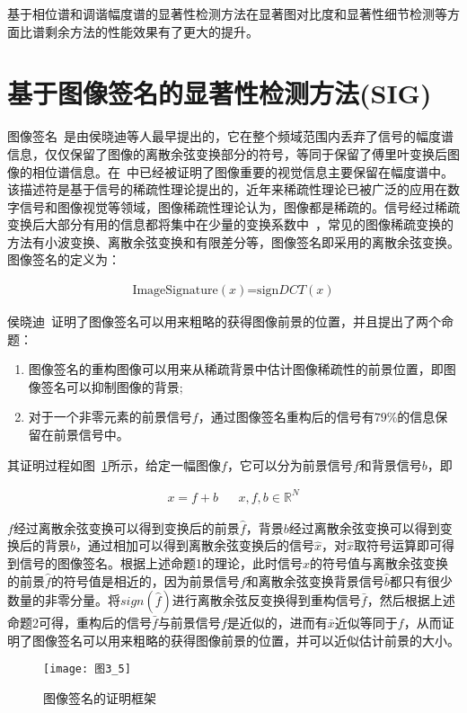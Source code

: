 基于相位谱和调谐幅度谱的显著性检测方法在显著图对比度和显著性细节检测等方面比谱剩余方法的性能效果有了更大的提升。

\section{基于图像签名的显著性检测方法(SIG)}
\label{3_5}
图像签名~\cite{HouXiaodiTPAMI2012Signature}是由侯晓迪等人最早提出的，它在整个频域范围内丢弃了信号的幅度谱信息，仅仅保留了图像的离散余弦变换部分的符号，等同于保留了傅里叶变换后图像的相位谱信息。在~\cite{Hou2014Phd}中已经被证明了图像重要的视觉信息主要保留在幅度谱中。该描述符是基于信号的稀疏性理论提出的，近年来稀疏性理论已被广泛的应用在数字信号和图像视觉等领域，图像稀疏性理论认为，图像都是稀疏的。信号经过稀疏变换后大部分有用的信息都将集中在少量的变换系数中~\cite{郑源彩2012稀疏}，常见的图像稀疏变换的方法有小波变换、离散余弦变换和有限差分等，图像签名即采用的离散余弦变换。图像签名的定义为：
\begin{linenomath}
\begin{align}
\textrm{ImageSignature$(x)$=sign$DCT(x)$}
\label{式3_27}
\end{align}
\end{linenomath}

侯晓迪~\cite{HouXiaodiTPAMI2012Signature}证明了图像签名可以用来粗略的获得图像前景的位置，并且提出了两个命题：
\begin{enumerate}
\item 图像签名的重构图像可以用来从稀疏背景中估计图像稀疏性的前景位置，即图像签名可以抑制图像的背景;
\item 对于一个非零元素的前景信号$f$，通过图像签名重构后的信号有$79\%$的信息保留在前景信号中。
\end{enumerate}
其证明过程如图~\ref{图3_5}所示，给定一幅图像$f$，它可以分为前景信号$f$和背景信号$b$，即
\begin{linenomath}
\begin{align}
x=f+b&&x,f,b\in\mathbb{R}^{N}
\label{式3_28}
\end{align}
\end{linenomath}
$f$经过离散余弦变换可以得到变换后的前景$\hat{f}$，背景$b$经过离散余弦变换可以得到变换后的背景$\hat{b}$，通过相加可以得到离散余弦变换后的信号$\hat{x}$，对$\hat{x}$取符号运算即可得到信号的图像签名。根据上述命题1的理论，此时信号$\hat{x}$的符号值与离散余弦变换的前景$\hat{f}$的符号值是相近的，因为前景信号$f$和离散余弦变换背景信号$\hat{b}$都只有很少数量的非零分量。将$sign(\hat{f})$进行离散余弦反变换得到重构信号$\bar{f}$，然后根据上述命题2可得，重构后的信号$\bar{f}$与前景信号$f$是近似的，进而有$\bar{x}$近似等同于$f$，从而证明了图像签名可以用来粗略的获得图像前景的位置，并可以近似估计前景的大小。
\begin{figure}[h] %
\centering
\texttt{[image: 图3\_5]}
\caption{图像签名的证明框架}
\label{图3_5}
\end{figure}


